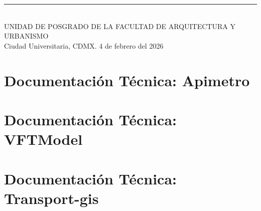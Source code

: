 \documentclass[12pt,letterpaper,oneside]{book}
\begin{document}
\begin{titlepage}
  \vfill

  \rule{0.7\textwidth}{0.4pt} \\
  {\footnotesize UNIDAD DE POSGRADO DE LA FACULTAD DE ARQUITECTURA Y URBANISMO} \\
  \vspace{0.4cm}
  {\footnotesize Ciudad Universitaria, CDMX. \hfill 4 de febrero del 2026}
\end{titlepage}

\frontmatter
\onehalfspacing
\ifdefined\SoloCapitulo\else\fi %
\tableofcontents
\listoffigures

\mainmatter









\ifdefined\SoloCapitulo\else

\appendix

\chapter{Documentación Técnica: Apimetro}
\label{anx:apimetro-tecnico}


\chapter{Documentación Técnica: VFTModel}
\label{anx:vftmodel-tecnico}


\chapter{Documentación Técnica: Transport-gis}
\label{anx:transportgis-tecnico}

\end{document}
